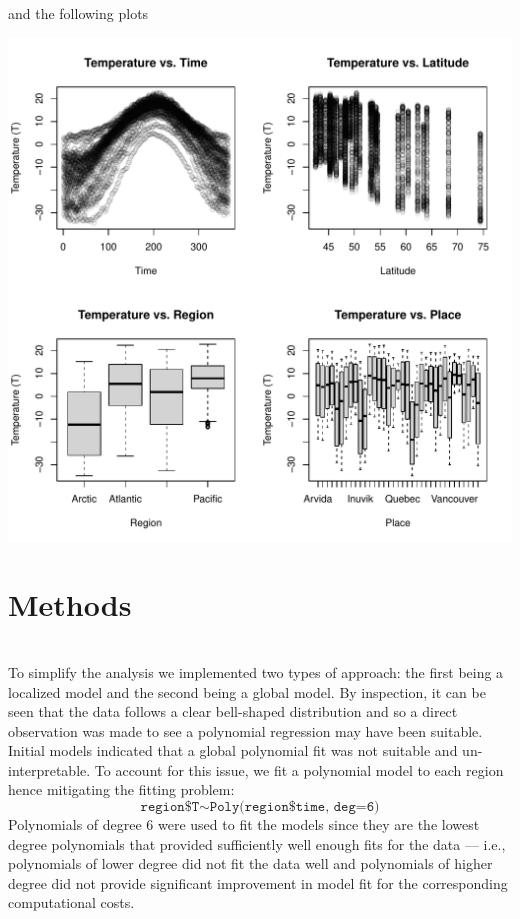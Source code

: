 \documentclass[aoas]{imsart}\usepackage[]{graphicx}\usepackage[]{xcolor}
\newenvironment{knitrout}{}{} %
\begin{document}
\noindent and the following plots
\begin{knitrout}
\color{fgcolor}

{\centering \includegraphics[width=0.99\linewidth,height=0.5\textheight]{figure/unnamed-chunk-3-1} 

}


\end{knitrout}

\section{Methods}\hfill\\

To simplify the analysis we implemented two types of approach: the first being a localized model and the second being a global model. By inspection, it can be seen that the data follows a clear bell-shaped distribution and so a direct observation was made to see a polynomial regression may have been suitable. Initial models indicated that a global polynomial fit was not suitable and un-interpretable. To account for this issue, we fit a polynomial model to each region hence mitigating the fitting problem:
$$\texttt{region\$T}\sim\texttt{Poly(region\$time, deg=6)}$$
Polynomials of degree 6 were used to fit the models since they are the lowest degree polynomials that provided sufficiently well enough fits for the data --- i.e., polynomials of lower degree did not fit the data well and polynomials of higher degree did not provide significant improvement in model fit for the corresponding computational costs.
\end{document}
